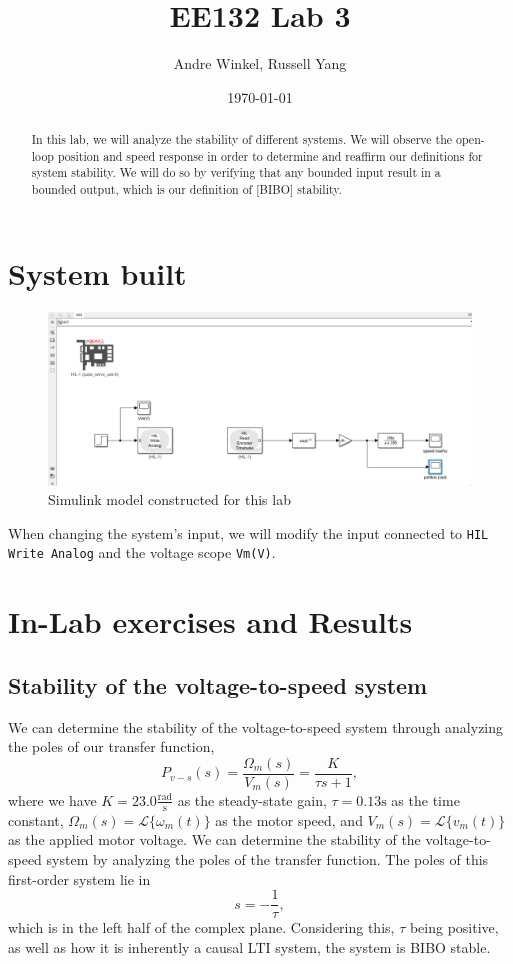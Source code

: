 \documentclass{article}
\title{EE132 Lab 3}
\author{Andre Winkel, Russell Yang}
\date{\today}
\begin{document}
\maketitle

\begin{abstract}
    In this lab, we will analyze the stability of different systems. We will observe the open-loop position and speed response in order to determine and reaffirm our definitions for system stability. We will do so by verifying that any bounded input result in a bounded output, which is our definition of [BIBO] stability.
\end{abstract}

\section{System built} 
\begin{figure} [H]
    \centering
    \includegraphics[width=0.75\linewidth]{system.png}
    \caption{Simulink model constructed for this lab}
    \label{fig:1}
\end{figure}
When changing the system's input, we will modify the input connected to \verb|HIL Write Analog| and the voltage scope \verb|Vm(V)|.

\section{In-Lab exercises and Results}
\subsection{Stability of the voltage-to-speed system}
We can determine the stability of the voltage-to-speed system through analyzing the poles of our transfer function,
\begin{equation}
    P_{v-s}(s)=\frac{\Omega_m(s)}{V_m(s)}=\frac{K}{\tau s+1},
\end{equation}
where we have $K=23.0 \frac{\text{rad}}{\text{s}}$ as the steady-state gain, $\tau=0.13\text{s}$ as the time constant, $\Omega_m(s)=\mathcal{L}\{\omega_m(t)\}$ as the motor speed, and $V_m(s)=\mathcal{L}\{v_m(t)\}$ as the applied motor voltage. We can determine the stability of the voltage-to-speed system by analyzing the poles of the transfer function. The poles of this first-order system lie in 
\begin{equation}
    s=-\frac{1}{\tau}, 
\end{equation}
which is in the left half of the complex plane. Considering this, $\tau$ being positive, as well as how it is inherently a causal LTI system, the system is BIBO stable.
\end{document}
